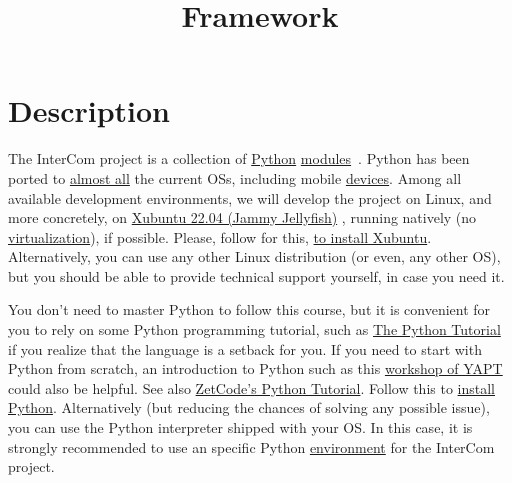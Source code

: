 
\title{Framework}

\maketitle

\section{Description}

The InterCom project \cite{intercom} is a collection of
\href{https://www.python.org/}{Python}
\href{https://docs.python.org/3/tutorial/modules.html#modules}{modules}~\cite{python}.
Python has been ported to
\href{https://www.python.org/download/other/}{almost all} the current
OSs, including mobile \href{https://kivy.org/#home}{devices}. Among
all available development environments, we will develop the project on
Linux, and more concretely, on
\href{https://xubuntu.org/download/}{Xubuntu 22.04 (Jammy Jellyfish)}
\cite{xubuntu}, running natively (no
\href{https://en.wikipedia.org/wiki/Virtualization}{virtualization}),
if possible. Please, follow for this,
\href{https://vicente-gonzalez-ruiz.github.io/Xubuntu_install/}{to
  install Xubuntu}. Alternatively, you can use any other Linux
distribution (or even, any other OS), but you should be able to
provide technical support yourself, in case you need it.

You don't need to master Python to follow this course, but it is
convenient for you to rely on some Python programming tutorial, such
as \href{https://docs.python.org/3/tutorial/}{The Python Tutorial}
\cite{python-tutorial} if you realize that the language is a setback
for you. If you need to start with Python from scratch, an
introduction to Python such as this
\href{https://github.com/vicente-gonzalez-ruiz/YAPT/tree/master/workshops/programacion_python_ESO}{workshop
  of YAPT} \cite{YAPT} could also be helpful. See also
\href{http://zetcode.com/lang/python/}{ZetCode's Python
  Tutorial}. Follow this to
\href{https://vicente-gonzalez-ruiz.github.io/Python_install/}{install
  Python}. Alternatively (but reducing the chances of solving any
possible issue), you can use the Python interpreter shipped with your
OS. In this case, it is strongly recommended to use an specific Python
\href{https://docs.python.org/3/library/venv.html}{environment} for
the InterCom project.

